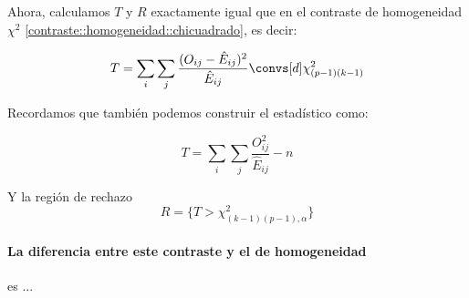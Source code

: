 Ahora, calculamos $T$ y $R$ exactamente igual que en el contraste de homogeneidad $\chi^2$ \ref{contraste::homogeneidad::chicuadrado}, es decir:

\[T = \sum_i \sum_j \frac{(O_{ij} - \hat{E}_{ij})^2}{\hat{E}_{ij}} \convs[d] \chi^2_{(p-1)(k-1)} \] 

Recordamos que también podemos construir el estadístico como:

\[T = \sum_{i}\sum_j \frac{O_{ij}^2}{\hat{E}_{ij}} - n\]

Y la región de rechazo \[R = \{T>\chi^2_{(k-1)(p-1),α}\}\]


\paragraph{La diferencia entre este contraste y el de homogeneidad} es ...
